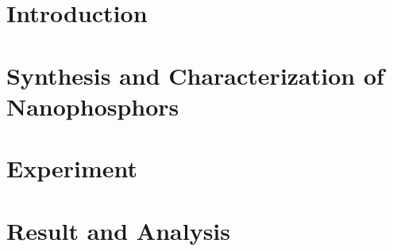 \documentclass{article}[10pt]
\begin{document}
  \newpage
  \section{Introduction}
    

  \newpage
  \section{Synthesis and Characterization of Nanophosphors}
    
  
  \newpage
  \section{Experiment}
    

  \newpage
  \section{Result and Analysis}
    
  \newpage
  
  
\end{document}
